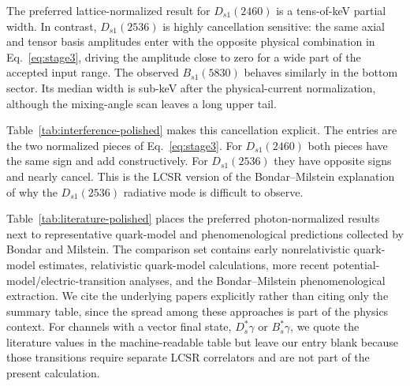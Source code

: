 \documentclass[11pt]{article}
\newcommand{\Dsone}{D_{s1}}
\newcommand{\Bsone}{B_{s1}}
\newcommand{\GeV}{\mathrm{GeV}}
\begin{document}
The preferred lattice-normalized result for $\Dsone(2460)$ is a tens-of-keV
partial width.  In contrast, $\Dsone(2536)$ is highly cancellation sensitive:
the same axial and tensor basis amplitudes enter with the opposite physical
combination in Eq.~\eqref{eq:stage3}, driving the amplitude close to zero for a
wide part of the accepted input range.  The observed $\Bsone(5830)$ behaves
similarly in the bottom sector.  Its median width is sub-keV after the
physical-current normalization, although the mixing-angle scan leaves a long
upper tail.

Table~\ref{tab:interference-polished} makes this cancellation explicit.  The
entries are the two normalized pieces of Eq.~\eqref{eq:stage3}.  For
$\Dsone(2460)$ both pieces have the same sign and add constructively.  For
$\Dsone(2536)$ they have opposite signs and nearly cancel.  This is the LCSR
version of the Bondar--Milstein explanation of why the $\Dsone(2536)$ radiative
mode is difficult to observe.

\begin{table}[htbp]
  \centering
  \caption{Median normalized axial and tensor pieces of the physical
  amplitudes.  The $2460$ pieces are constructive, whereas the $2536$ pieces
  are destructive.  All $G$ values are in $\GeV^{-1}$.}
  \label{tab:interference-polished}
\end{table}

Table~\ref{tab:literature-polished} places the preferred photon-normalized
results next to representative quark-model and phenomenological predictions
collected by Bondar and Milstein.  The comparison set contains early
nonrelativistic quark-model estimates, relativistic quark-model calculations,
more recent potential-model/electric-transition analyses, and the
Bondar--Milstein phenomenological extraction.  We cite the underlying papers
explicitly rather than citing only the summary table, since the spread among
these approaches is part of the physics context.  For channels with a vector
final state, $D_s^*\gamma$ or $B_s^*\gamma$, we quote the literature values in
the machine-readable table but leave our entry blank because those transitions
require separate LCSR correlators and are not part of the present calculation.
\end{document}
